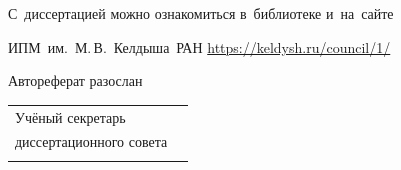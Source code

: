 \vspace{6mm plus1fill}
С~диссертацией можно ознакомиться в~библиотеке и~на~сайте\par\nobreak
\mbox{ИПМ им.~М.\,В.~Келдыша РАН} \url{https://keldysh.ru/council/1/}

\vspace{16mm plus1fill}
Автореферат разослан \synopsisDate

\vfill
\begin{tabularx}{\textwidth}{@{}Xr@{}}
Учёный секретарь & \\
диссертационного совета  & \\
 & 
\end{tabularx}
\endgroup
